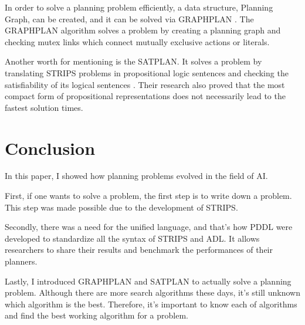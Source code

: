 \documentclass[letterpaper]{IEEEtran}
\begin{document}
In order to solve a planning problem efficiently, a data structure, Planning Graph, can be created, and it can be solved via GRAPHPLAN \cite{graphplan}. The GRAPHPLAN algorithm solves a problem by creating a planning graph and checking mutex links which connect mutually exclusive actions or literals.

Another worth for mentioning is the SATPLAN. It solves a problem by translating STRIPS problems in propositional logic sentences and checking the satisfiability of its logical sentences \cite{satplan}. Their research also proved that the most compact form of propositional representations does not necessarily lead to the fastest solution times.

\section{Conclusion}
In this paper, I showed how planning problems evolved in the field of AI. 

First, if one wants to solve a problem, the first step is to write down a problem. This step was made possible due to the development of STRIPS. 

Secondly, there was a need for the unified language, and that's how PDDL were developed to standardize all the syntax of STRIPS and ADL. It allows researchers to share their results and benchmark the performances of their planners. 

Lastly, I introduced GRAPHPLAN and SATPLAN to actually solve a planning problem. Although there are more search algorithms these days, it's still unknown which algorithm is the best. Therefore, it's important to know each of algorithms and find the best working algorithm for a problem.

\medskip
\printbibliography
\end{document}
